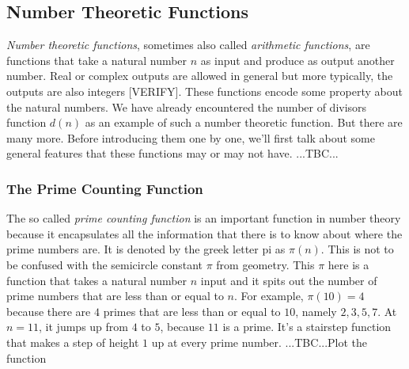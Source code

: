 
\subsection{Number Theoretic Functions}
\emph{Number theoretic functions}, sometimes also called \emph{arithmetic functions}, are functions that take a natural number $n$ as input and produce as output another number. Real or complex outputs are allowed in general but more typically, the outputs are also integers [VERIFY]. These functions encode some property about the natural numbers. We have already encountered the number of divisors function $d(n)$ as an example of such a number theoretic function. But there are many more. Before introducing them one by one, we'll first talk about some general features that these functions may or may not have. ...TBC...






\subsubsection{The Prime Counting Function}
The so called \emph{prime counting function} is an important function in number theory because it encapsulates all the information that there is to know about where the prime numbers are. It is denoted by the greek letter pi as $\pi(n)$. This is not to be confused with the semicircle constant $\pi$ from geometry. This $\pi$ here is a function that takes a natural number $n$ input and it spits out the number of prime numbers that are less than or equal to $n$. For example, $\pi(10) = 4$ because there are $4$ primes that are less than or equal to $10$, namely $2,3,5,7$. At $n = 11$, it jumps up from $4$ to $5$, because $11$ is a prime. It's a stairstep function that makes a step of height $1$ up at every prime number. ...TBC...Plot the function


